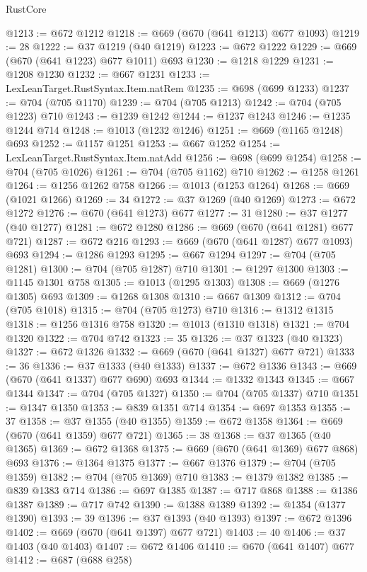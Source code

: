 \begin{lexlean}{RustCore}
\begin{coremodule}
@1213 := @672 @1212
@1218 := @669 (@670 (@641 @1213) @677 @1093)
@1219 := 28
@1222 := @37 @1219 (@40 @1219)
@1223 := @672 @1222
@1229 := @669 (@670 (@641 @1223) @677 @1011) @693
@1230 := @1218 @1229
@1231 := @1208 @1230
@1232 := @667 @1231
@1233 := LexLeanTarget.RustSyntax.Item.natRem
@1235 := @698 (@699 @1233)
@1237 := @704 (@705 @1170)
@1239 := @704 (@705 @1213)
@1242 := @704 (@705 @1223) @710
@1243 := @1239 @1242
@1244 := @1237 @1243
@1246 := @1235 @1244 @714
@1248 := @1013 (@1232 @1246)
@1251 := @669 (@1165 @1248) @693
@1252 := @1157 @1251
@1253 := @667 @1252
@1254 := LexLeanTarget.RustSyntax.Item.natAdd
@1256 := @698 (@699 @1254)
@1258 := @704 (@705 @1026)
@1261 := @704 (@705 @1162) @710
@1262 := @1258 @1261
@1264 := @1256 @1262 @758
@1266 := @1013 (@1253 @1264)
@1268 := @669 (@1021 @1266)
@1269 := 34
@1272 := @37 @1269 (@40 @1269)
@1273 := @672 @1272
@1276 := @670 (@641 @1273) @677
@1277 := 31
@1280 := @37 @1277 (@40 @1277)
@1281 := @672 @1280
@1286 := @669 (@670 (@641 @1281) @677 @721)
@1287 := @672 @216
@1293 := @669 (@670 (@641 @1287) @677 @1093) @693
@1294 := @1286 @1293
@1295 := @667 @1294
@1297 := @704 (@705 @1281)
@1300 := @704 (@705 @1287) @710
@1301 := @1297 @1300
@1303 := @1145 @1301 @758
@1305 := @1013 (@1295 @1303)
@1308 := @669 (@1276 @1305) @693
@1309 := @1268 @1308
@1310 := @667 @1309
@1312 := @704 (@705 @1018)
@1315 := @704 (@705 @1273) @710
@1316 := @1312 @1315
@1318 := @1256 @1316 @758
@1320 := @1013 (@1310 @1318)
@1321 := @704 @1320
@1322 := @704 @742
@1323 := 35
@1326 := @37 @1323 (@40 @1323)
@1327 := @672 @1326
@1332 := @669 (@670 (@641 @1327) @677 @721)
@1333 := 36
@1336 := @37 @1333 (@40 @1333)
@1337 := @672 @1336
@1343 := @669 (@670 (@641 @1337) @677 @690) @693
@1344 := @1332 @1343
@1345 := @667 @1344
@1347 := @704 (@705 @1327)
@1350 := @704 (@705 @1337) @710
@1351 := @1347 @1350
@1353 := @839 @1351 @714
@1354 := @697 @1353
@1355 := 37
@1358 := @37 @1355 (@40 @1355)
@1359 := @672 @1358
@1364 := @669 (@670 (@641 @1359) @677 @721)
@1365 := 38
@1368 := @37 @1365 (@40 @1365)
@1369 := @672 @1368
@1375 := @669 (@670 (@641 @1369) @677 @868) @693
@1376 := @1364 @1375
@1377 := @667 @1376
@1379 := @704 (@705 @1359)
@1382 := @704 (@705 @1369) @710
@1383 := @1379 @1382
@1385 := @839 @1383 @714
@1386 := @697 @1385
@1387 := @717 @868
@1388 := @1386 @1387
@1389 := @717 @742
@1390 := @1388 @1389
@1392 := @1354 (@1377 @1390)
@1393 := 39
@1396 := @37 @1393 (@40 @1393)
@1397 := @672 @1396
@1402 := @669 (@670 (@641 @1397) @677 @721)
@1403 := 40
@1406 := @37 @1403 (@40 @1403)
@1407 := @672 @1406
@1410 := @670 (@641 @1407) @677
@1412 := @687 (@688 @258)

\end{coremodule}
\end{lexlean}
